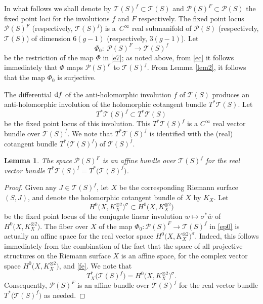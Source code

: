\documentclass[pdftex]{sigma}
\numberwithin{equation}{section}
\newtheorem{Lemma}[Theorem]{Lemma}
\begin{document}
In what follows we shall denote by
${\mathcal T}(S)^f \subset {\mathcal T}(S)$ and $ {\mathcal P}(S)^F \subset {\mathcal P}(S)$
 the fixed point loci for the involutions $f$ and $F$ respectively. The fixed point locus ${\mathcal P}(S)^F$ \big(respectively, ${\mathcal T}(S)^f$\big) is a~$C^\infty$ real
submanifold of ${\mathcal P}(S)$ (respectively, ${\mathcal T}(S)$) of dimension $6(g-1)$
(respectively, $3(g-1)$). Let
\begin{equation}\label{ep0}
\Phi_0\colon\ {\mathcal P}(S)^F \longrightarrow {\mathcal T}(S)^f
\end{equation}
be the restriction of the map $\Phi$ in \eqref{e7}; as noted above, from \eqref{ec} it follows immediately that
$\Phi$ maps ${\mathcal P}(S)^F$ to ${\mathcal T}(S)^f$. From Lemma \ref{lem2}, it follows that the map
$\Phi_0$ is surjective.

The differential ${\rm d}f$ of the anti-holomorphic involution $f$ of ${\mathcal T}(S)$ produces an anti-holomorphic
involution of the holomorphic cotangent bundle $T^*{\mathcal T}(S)$. Let
\[
T^*{\mathcal T}(S)^f \subset T^*{\mathcal T}(S)
\]
be the fixed point locus of this involution. This $T^*{\mathcal T}(S)^f$ is a $C^\infty$ real
vector bundle over ${\mathcal T}(S)^f$. We note that $T^*{\mathcal T}(S)^f$ is identified with the (real) cotangent
bundle $T^*\big({\mathcal T}(S)^f\big)$ of ${\mathcal T}(S)^f$.

\begin{Lemma} \label{affinebun}The space ${\mathcal P}(S)^F$ is an affine bundle over
${\mathcal T}(S)^f$ for the real vector bundle $T^*{\mathcal T}(S)^f = T^*\bigl({\mathcal T}(S)^f\bigr)$.
\end{Lemma}

\begin{proof}
Given any $J \in {\mathcal T}(S)^f$, let $X$ be the corresponding Riemann surface $(S, J)$, and denote the
holomorphic cotangent bundle of $X$ by $K_X$. Let
\[
H^0\bigl(X, K^{\otimes 2}_X\bigr)^\sigma \subset H^0\bigl(X, K^{\otimes 2}_X\bigr)
\]
be the fixed point locus of the conjugate linear involution $w \longmapsto \sigma^*\overline{w}$
of $H^0\bigl(X, K^{\otimes 2}_X\bigr)$. The fiber over $X$ of the map $\Phi_0\colon \mathcal P(S)^F
 \longrightarrow {\mathcal T}(S)^f$ in \eqref{ep0} is actually an affine space for
the real vector space $H^0\bigl(X, K^{\otimes 2}_X\bigr)^\sigma$. Indeed, this follows
immediately from the combination of the fact that
the space of all projective structures on the Riemann surface $X$ is an affine
space, for the complex vector space $H^0\bigl(X, K^{\otimes 2}_X\bigr)$, and \eqref{fe}.
We note that
\[
T^*_X \bigl({\mathcal T}(S)^f\bigr) = H^0\bigl(X, K^{\otimes 2}_X\bigr)^\sigma.\]
Consequently, ${\mathcal P}(S)^F$ is an affine bundle over
${\mathcal T}(S)^f$ for the real vector bundle $T^*\bigl({\mathcal T}(S)^f\bigr)$ as needed.
\end{proof}
\end{document}
